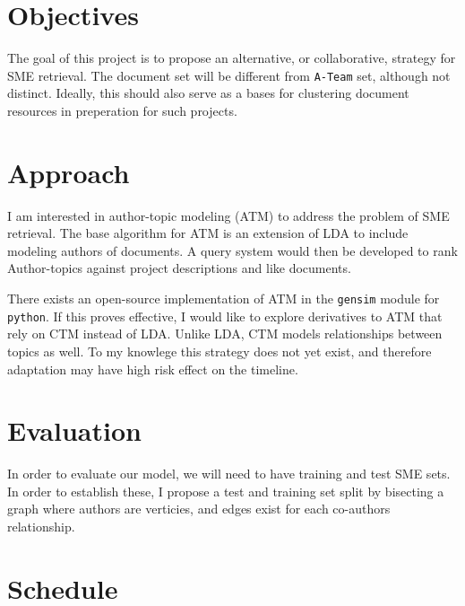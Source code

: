 \documentclass{article}
\begin{document}
\section{Objectives}

The goal of this project is to propose an alternative, or collaborative, strategy for
SME retrieval. The document set will be different from \texttt{A-Team} set, although
not distinct. Ideally, this should also serve as a bases for clustering document
resources in preperation for such projects.

\section{Approach}

I am interested in author-topic\cite{Rosen-Zvi2004} modeling (ATM) to address the problem of
SME retrieval. The base algorithm for ATM is an extension of LDA to include modeling authors
of documents. A query system would then be developed to rank Author-topics against project
descriptions and like documents.

There exists an open-source implementation of ATM in the \texttt{gensim}\cite{rehurek_lrec}
module for \texttt{python}. If this proves effective, I would like to explore derivatives
to ATM that rely on CTM instead of LDA. Unlike LDA, CTM models relationships
between topics as well. %
To my knowlege this strategy does not yet exist, and therefore adaptation may have high risk
effect on the timeline.

\section{Evaluation}

In order to evaluate our model, we will need to have training and test SME sets. In order to establish these, I propose a test and training set split by bisecting\cite{Feige2002} a graph where authors are verticies, and edges exist for each co-authors relationship.



\section{Schedule}
\end{document}
